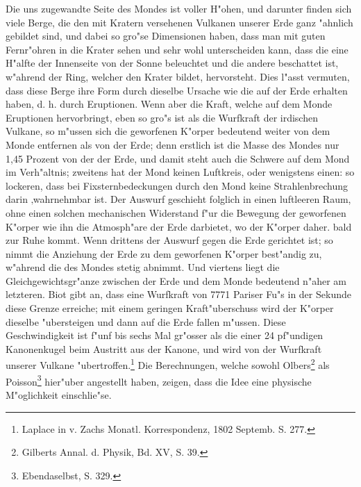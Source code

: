 \documentclass[a4paper, 11pt, oneside]{article}
\begin{document}
Die uns zugewandte Seite des Mondes ist voller H"ohen, und darunter finden sich viele Berge, die den mit Kratern versehenen Vulkanen unserer Erde ganz "ahnlich gebildet sind, und dabei so gro"se Dimensionen haben, dass man mit guten Fernr"ohren in die Krater sehen und sehr wohl unterscheiden kann, dass die eine H"alfte der Innenseite von der Sonne beleuchtet und die andere beschattet ist, w"ahrend der Ring, welcher den Krater bildet, hervorsteht. Dies l"asst vermuten, dass diese Berge ihre Form durch dieselbe Ursache wie die auf der Erde erhalten haben, d. h. durch Eruptionen. Wenn aber die Kraft, welche auf dem Monde Eruptionen hervorbringt, eben so gro"s ist als die Wurfkraft der irdischen Vulkane, so m"ussen sich die geworfenen K"orper bedeutend weiter von dem Monde entfernen als von der Erde; denn erstlich ist die Masse des Mondes nur 1,45 Prozent von der der Erde, und damit steht auch die Schwere auf dem Mond im Verh"altnis; zweitens hat der Mond keinen Luftkreis, oder wenigstens einen: so lockeren, dass bei Fixsternbedeckungen durch den Mond keine Strahlenbrechung darin ‚wahrnehmbar ist. Der Auswurf geschieht folglich in einen luftleeren Raum, ohne einen solchen mechanischen Widerstand f"ur die Bewegung der geworfenen K"orper wie ihn die Atmosph"are der Erde darbietet, wo der K"orper daher. bald zur Ruhe kommt. Wenn drittens der Auswurf gegen die Erde gerichtet ist; so nimmt die Anziehung der Erde zu dem geworfenen K"orper best"andig zu, w"ahrend die des Mondes stetig abnimmt. Und viertens liegt die Gleichgewichtsgr"anze zwischen der Erde und dem Monde bedeutend n"aher am letzteren. Biot gibt an, dass eine Wurfkraft von 7771 Pariser Fu"s in der Sekunde diese Grenze erreiche; mit einem geringen Kraft"uberschuss wird der K"orper dieselbe "ubersteigen und dann auf die Erde fallen m"ussen. Diese Geschwindigkeit ist f"unf bis sechs Mal gr"osser als die einer 24 pf"undigen Kanonenkugel beim Austritt aus der Kanone, und wird von der Wurfkraft unserer Vulkane "ubertroffen.\footnote{Laplace in v. Zachs Monatl. Korrespondenz, 1802 Septemb. S. 277.} Die Berechnungen, welche sowohl Olbers\footnote{Gilberts Annal. d. Physik, Bd. XV, S. 39.} als Poisson\footnote{Ebendaselbst, S. 329.} hier"uber angestellt haben, zeigen, dass die Idee eine physische M"oglichkeit einschlie"se.
\end{document}

